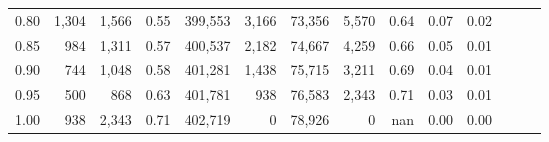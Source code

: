 \begin{tabular}{rrrrrrrrrrrrrr}
0.80 &   1,304 &  1,566 &  0.55 &  399,553 &    3,166 &  73,356 &   5,570 &  0.64 &  0.07 &      0.02 \\
0.85 &     984 &  1,311 &  0.57 &  400,537 &    2,182 &  74,667 &   4,259 &  0.66 &  0.05 &      0.01 \\
0.90 &     744 &  1,048 &  0.58 &  401,281 &    1,438 &  75,715 &   3,211 &  0.69 &  0.04 &      0.01 \\
0.95 &     500 &    868 &  0.63 &  401,781 &      938 &  76,583 &   2,343 &  0.71 &  0.03 &      0.01 \\
1.00 &     938 &  2,343 &  0.71 &  402,719 &        0 &  78,926 &       0 &   nan &  0.00 &      0.00 \\
\bottomrule
\end{tabular}
